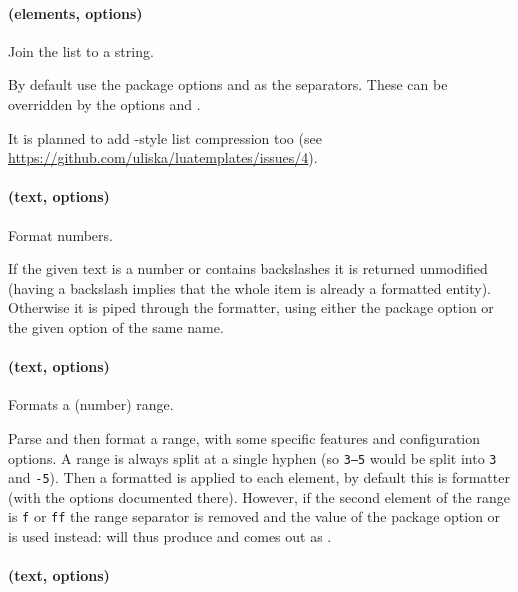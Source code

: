 \documentclass[12pt]{scrartcl}
\begin{document}
\paragraph{ (elements, options)}

Join the list to a string.

By default use the package options  and 
as the separators. These can be overridden  by the options 
and .

It is planned to add -style list compression too (see
\url{https://github.com/uliska/luatemplates/issues/4}).

\paragraph{ (text, options)}

Format numbers.

If the given text is a number or contains backslashes it is returned unmodified
(having a backslash implies that the whole item is already a formatted
entity). Otherwise it is piped through the  formatter, using either
the package option  or the given option of the same name.


\paragraph{ (text, options)}

Formats a (number) range.

Parse and then format a range, with some specific features and configuration
options.  A range is always split at a single hyphen (so \texttt{3--5} would be
split into \texttt{3} and \texttt{-5}).  Then a formatted is applied to each
element, by default this is  formatter (with the options
documented there).  However, if the second element of the range is \texttt{f} or
\texttt{ff} the range separator is removed and the value of the package option
 or  is used instead:
\texttt{} will thus produce  and
\texttt{} comes out as
.


\paragraph{ (text, options)}
\end{document}
